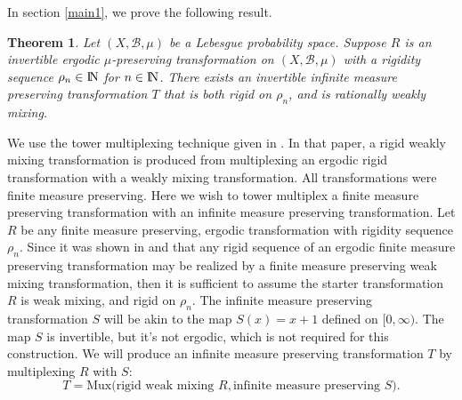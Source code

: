\documentclass[12pt]{amsart}
\newtheorem{theorem}{Theorem}[section]
\begin{document}
In section \ref{main1}, 
we prove the following result. 
\begin{theorem}
\label{infinite_towerplex}
Let $(X,\mathcal{B},\mu)$ be a Lebesgue probability space. 
Suppose $R$ is an invertible 
ergodic $\mu$-preserving transformation on $(X,\mathcal{B},\mu)$ with 
a rigidity sequence $\rho_n \in {\hbox{\rm\setbox1=\hbox{I}\copy1\kern-.45\wd1 N}}$ for $n\in {\hbox{\rm\setbox1=\hbox{I}\copy1\kern-.45\wd1 N}}$. 
There exists an invertible infinite measure preserving transformation $T$ that is both 
rigid on $\rho_n$, and is rationally weakly mixing. 
\end{theorem}
\noindent 
We use the tower multiplexing technique 
given in \cite{Towerplex1}. In that paper, 
a rigid weakly mixing transformation 
is produced from multiplexing an ergodic rigid transformation 
with a weakly mixing transformation. 
All transformations were finite measure preserving. 
Here we wish to tower multiplex a finite measure preserving 
transformation with an infinite measure preserving 
transformation. Let $R$ be any finite measure preserving, 
ergodic transformation with rigidity sequence $\rho_n$. 
Since it was shown in \cite{Towerplex1} and \cite{FayTho14} that any rigid sequence 
of an ergodic finite measure preserving transformation may be realized 
by a finite measure preserving weak mixing transformation, then 
it is sufficient to assume the starter transformation $R$ is weak mixing, 
and rigid on $\rho_n$. 
The infinite measure preserving transformation $S$ will be akin to the map $S(x) = x + 1$ 
defined on $[0,\infty)$. The map $S$ is invertible, but it's not ergodic, 
which is not required for this construction. 
We will produce an infinite measure preserving transformation $T$ 
by multiplexing $R$ with $S$: 
\[
T = \mbox{Mux}\Big( \mbox{rigid weak mixing }R , \mbox{infinite measure preserving }S \Big) .
\] 
\end{document}
